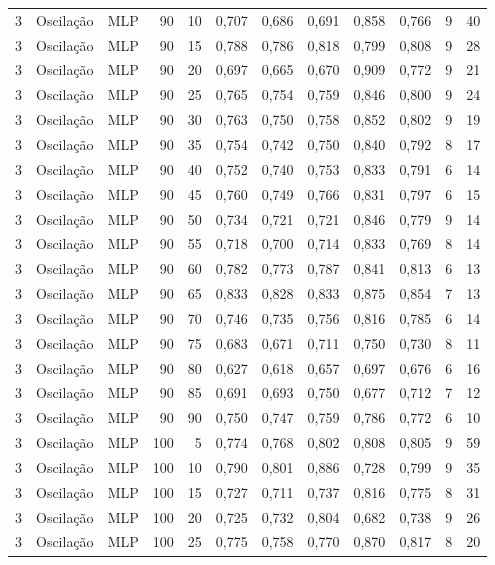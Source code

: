 \begin{longtable}{@{}rllrrrrrrrrr@{}}
3 & Oscilação & MLP & 90 & 10 & 0,707 & 0,686 & 0,691 & 0,858 & 0,766 & 9 & 40 \\
3 & Oscilação & MLP & 90 & 15 & 0,788 & 0,786 & 0,818 & 0,799 & 0,808 & 9 & 28 \\
3 & Oscilação & MLP & 90 & 20 & 0,697 & 0,665 & 0,670 & 0,909 & 0,772 & 9 & 21 \\
3 & Oscilação & MLP & 90 & 25 & 0,765 & 0,754 & 0,759 & 0,846 & 0,800 & 9 & 24 \\
3 & Oscilação & MLP & 90 & 30 & 0,763 & 0,750 & 0,758 & 0,852 & 0,802 & 9 & 19 \\
3 & Oscilação & MLP & 90 & 35 & 0,754 & 0,742 & 0,750 & 0,840 & 0,792 & 8 & 17 \\
3 & Oscilação & MLP & 90 & 40 & 0,752 & 0,740 & 0,753 & 0,833 & 0,791 & 6 & 14 \\
3 & Oscilação & MLP & 90 & 45 & 0,760 & 0,749 & 0,766 & 0,831 & 0,797 & 6 & 15 \\
3 & Oscilação & MLP & 90 & 50 & 0,734 & 0,721 & 0,721 & 0,846 & 0,779 & 9 & 14 \\
3 & Oscilação & MLP & 90 & 55 & 0,718 & 0,700 & 0,714 & 0,833 & 0,769 & 8 & 14 \\
3 & Oscilação & MLP & 90 & 60 & 0,782 & 0,773 & 0,787 & 0,841 & 0,813 & 6 & 13 \\
3 & Oscilação & MLP & 90 & 65 & 0,833 & 0,828 & 0,833 & 0,875 & 0,854 & 7 & 13 \\
3 & Oscilação & MLP & 90 & 70 & 0,746 & 0,735 & 0,756 & 0,816 & 0,785 & 6 & 14 \\
3 & Oscilação & MLP & 90 & 75 & 0,683 & 0,671 & 0,711 & 0,750 & 0,730 & 8 & 11 \\
3 & Oscilação & MLP & 90 & 80 & 0,627 & 0,618 & 0,657 & 0,697 & 0,676 & 6 & 16 \\
3 & Oscilação & MLP & 90 & 85 & 0,691 & 0,693 & 0,750 & 0,677 & 0,712 & 7 & 12 \\
3 & Oscilação & MLP & 90 & 90 & 0,750 & 0,747 & 0,759 & 0,786 & 0,772 & 6 & 10 \\
3 & Oscilação & MLP & 100 & 5 & 0,774 & 0,768 & 0,802 & 0,808 & 0,805 & 9 & 59 \\
3 & Oscilação & MLP & 100 & 10 & 0,790 & 0,801 & 0,886 & 0,728 & 0,799 & 9 & 35 \\
3 & Oscilação & MLP & 100 & 15 & 0,727 & 0,711 & 0,737 & 0,816 & 0,775 & 8 & 31 \\
3 & Oscilação & MLP & 100 & 20 & 0,725 & 0,732 & 0,804 & 0,682 & 0,738 & 9 & 26 \\
3 & Oscilação & MLP & 100 & 25 & 0,775 & 0,758 & 0,770 & 0,870 & 0,817 & 8 & 20 \\

\end{longtable}

